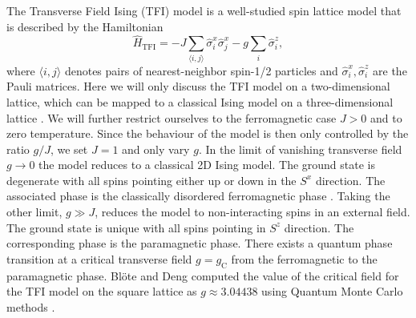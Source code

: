 The Transverse Field Ising (TFI) model is a well-studied spin lattice model that is described by the Hamiltonian
\begin{equation}
	\label{eq:TFI_Hamiltonian}
	\hat{H}_\text{TFI} = -J\sum_{\langle i,j\rangle} \hat{\sigma}^x_i \hat{\sigma}^x_j - g\sum_{i} \hat{\sigma}^z_i,
\end{equation}
where $\langle i,j\rangle$ denotes pairs of nearest-neighbor spin-1/2 particles and $\hat{\sigma}^x_i, \hat{\sigma}^z_i$ are the Pauli matrices. Here we will only discuss the TFI model on a two-dimensional lattice, which can be mapped to a classical Ising model on a three-dimensional lattice \cite{cite:from_d_dimensional_quantum_to_dp1_dimensional_classical}. We will further restrict ourselves to the ferromagnetic case $J > 0$ and to zero temperature. Since the behaviour of the model is then only controlled by the ratio $g/J$, we set $J = 1$ and only vary $g$. In the limit of vanishing transverse field $g \rightarrow 0$ the model reduces to a classical 2D Ising model. The ground state is degenerate with all spins pointing either up or down in the $S^x$ direction. The associated phase is the classically disordered ferromagnetic phase \cite{cite:critical_behavior_of_the_two_dim_ising_model_in_transverse_field, cite:quantum_ising_phases_and_transitions_in_transverse_ising_models}. Taking the other limit, $g \gg J$, reduces the model to non-interacting spins in an external field. The ground state is unique with all spins pointing in $S^z$ direction. The corresponding phase is the paramagnetic phase. There exists a quantum phase transition at a critical transverse field $g = g_\text{C}$ from the ferromagnetic to the paramagnetic phase. Blöte and Deng computed the value of the critical field for the TFI model on the square lattice as $g \approx 3.04438$ using Quantum Monte Carlo methods \cite{cite:cluster_monte_carlo_simulation_of_TFI}. \par